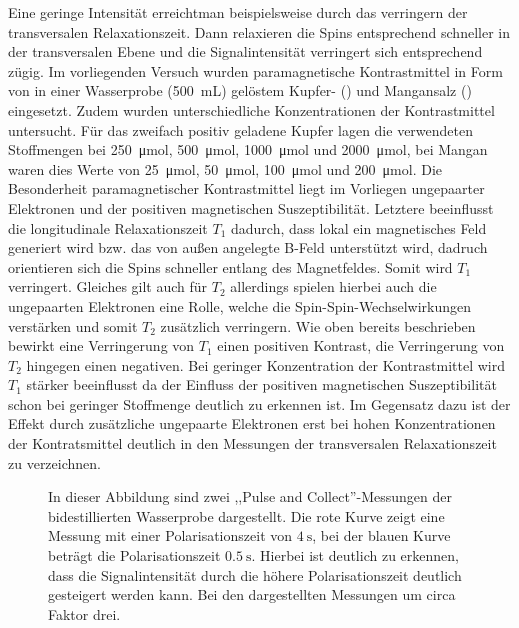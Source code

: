 Eine geringe Intensität erreichtman beispielsweise durch das verringern der transversalen Relaxationszeit.
Dann relaxieren die Spins entsprechend schneller in der transversalen Ebene und die Signalintensität verringert sich entsprechend zügig.
Im vorliegenden Versuch wurden paramagnetische Kontrastmittel in Form von in einer Wasserprobe (\SI{500}{\milli \liter}) gelöstem Kupfer- () und Mangansalz () eingesetzt.
Zudem wurden unterschiedliche Konzentrationen der Kontrastmittel untersucht. 
Für das zweifach positiv geladene Kupfer lagen die verwendeten Stoffmengen bei \SI{250}{\micro \mol}, \SI{500}{\micro \mol}, \SI{1000}{\micro \mol} und \SI{2000}{\micro \mol}, bei Mangan waren dies Werte von \SI{25}{\micro \mol}, \SI{50}{\micro \mol}, \SI{100}{\micro \mol} und \SI{200}{\micro \mol}.
Die Besonderheit paramagnetischer Kontrastmittel liegt im Vorliegen ungepaarter Elektronen und der positiven magnetischen Suszeptibilität.
Letztere beeinflusst die longitudinale Relaxationszeit $T_1$ dadurch, dass lokal ein magnetisches Feld generiert wird bzw. das von außen angelegte B-Feld unterstützt wird, dadruch orientieren sich die Spins schneller entlang des Magnetfeldes.
Somit wird $T_1$ verringert.
Gleiches gilt auch für $T_2$ allerdings spielen hierbei auch die ungepaarten Elektronen eine Rolle, welche die Spin-Spin-Wechselwirkungen verstärken und somit $T_2$ zusätzlich verringern.
Wie oben bereits beschrieben bewirkt eine Verringerung von $T_1$ einen positiven Kontrast, die Verringerung von $T_2$ hingegen einen negativen.
Bei geringer Konzentration der Kontrastmittel wird $T_1$ stärker beeinflusst da der Einfluss der positiven magnetischen Suszeptibilität schon bei geringer Stoffmenge deutlich zu erkennen ist.
Im Gegensatz dazu ist der Effekt durch zusätzliche ungepaarte Elektronen erst bei hohen Konzentrationen der Kontratsmittel deutlich in den Messungen der transversalen Relaxationszeit zu verzeichnen. \cite{Schmidt}

\begin{figure}[H]
    \centering
    
    \caption[Abhängigkeit der Signalintensität von der Polarisationszeit.]{In dieser Abbildung sind zwei ,,Pulse and Collect''-Messungen der bidestillierten Wasserprobe dargestellt. Die rote Kurve zeigt eine Messung mit einer Polarisationszeit von $\SI{4}{\second}$, bei der blauen Kurve beträgt die Polarisationszeit $\SI{0.5}{\second}$. Hierbei ist deutlich zu erkennen, dass die Signalintensität durch die höhere Polarisationszeit deutlich gesteigert werden kann. Bei den dargestellten Messungen um circa Faktor drei.} 
    \label{fig:SignalintensitaetPolarisationszeit}    
\end{figure}

